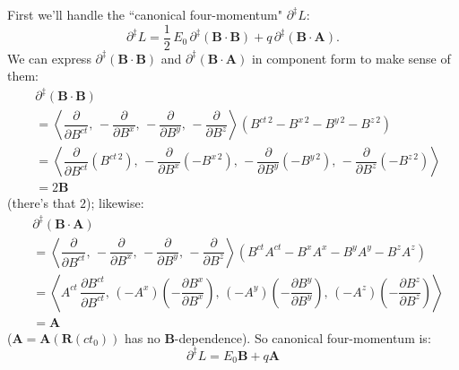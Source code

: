 \documentclass[12pt]{article}
\renewcommand{\vv}[1]{\mathbf{#1}}
\begin{document}
First we'll handle the ``canonical four-momentum" $\partialup^\ddagger L$:
\begin{equation*}
\partialup^\ddagger L =  \dfrac{1}{2} \, E_0 \, \partialup^\ddagger (\vv B \cdot \vv B) + q \, \partialup^\ddagger (\vv B \cdot \vv A) .
\end{equation*}
We can express $\partialup^\ddagger (\vv B \cdot \vv B)$ and $\partialup^\ddagger (\vv B \cdot \vv A)$ in component form to make sense of them:
\begin{equation*}
\begin{split}
& \partialup^\ddagger(\vv B \cdot \vv B) \\[2pt]
&= \left \langle \dfrac{\partial}{\partial B^{ct}} , \,  - \dfrac{\partial}{\partial B^x} , \, - \dfrac{\partial}{\partial B^y} , \, - \dfrac{\partial}{\partial B^z} \right \rangle \left( B^{ct \, 2} - B^{x \, 2} - B^{y \, 2} - B^{z \, 2} \right) \\[3pt]
&= \left \langle \dfrac{\partial}{\partial B^{ct}} \left( B^{ct \, 2} \right) , \, - \dfrac{\partial}{\partial B^x} \left( - B^{x \, 2} \right) , \, - \dfrac{\partial}{\partial B^y} \left( - B^{y \, 2} \right)  , \, - \dfrac{\partial}{\partial B^z} \left( - B^{z \, 2} \right)  \right \rangle \\[2pt]
&= 2 \vv B
\end{split}
\end{equation*}
(there's that $2$); likewise:
\begin{equation*}
\begin{split}
&\partialup^\ddagger (\vv B \cdot \vv A) \\[2pt]
&= \left \langle \dfrac{\partial}{\partial B^{ct}} , \,  - \dfrac{\partial}{\partial B^x} , \, - \dfrac{\partial}{\partial B^y} , \, - \dfrac{\partial}{\partial B^z} \right \rangle \left( B^{ct} A^{ct} - B^x A^x - B^y A^y - B^z A^z \right) \\[3pt]
&= \left \langle A^{ct} \, \dfrac{\partial B^{ct}}{\partial B^{ct}} , \,  (- A^x) \left( - \dfrac{\partial B^x}{\partial B^x} \right) , \, (-A^y) \left( - \dfrac{\partial B^y}{\partial B^y} \right) , \, (-A^z) \left( - \dfrac{\partial B^z}{\partial B^z} \right) \right \rangle \\[2pt]
&= \vv A 
\end{split}
\end{equation*}
($\vv A = \vv A(\vv R(ct_0))$ has no $\vv B$-dependence). So canonical four-momentum is:
\begin{equation*}
\partialup^\ddagger L =  E_0 \vv B + q \vv A
\end{equation*}
\end{document}

